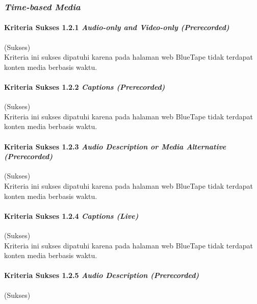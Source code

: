 \subsubsection{\textit{Time-based Media}}
\label{subsubsec:kepatuhan_bluetape_time_based_media}

\paragraph{Kriteria Sukses 1.2.1 \textit{Audio-only and Video-only (Prerecorded)}}
\label{par:kepatuhan_bluetape_kriteria_sukses_1.2.1}
(Sukses)\\

Kriteria ini sukses dipatuhi karena pada halaman web BlueTape tidak terdapat konten media berbasis waktu.

\paragraph{Kriteria Sukses 1.2.2 \textit{Captions (Prerecorded)}}
\label{par:kepatuhan_bluetape_kriteria_sukses_1.2.2}
(Sukses)\\

Kriteria ini sukses dipatuhi karena pada halaman web BlueTape tidak terdapat konten media berbasis waktu.

\paragraph{Kriteria Sukses 1.2.3 \textit{Audio Description or Media Alternative (Prerecorded)}}
\label{par:kepatuhan_bluetape_kriteria_sukses_1.2.3}
(Sukses)\\

Kriteria ini sukses dipatuhi karena pada halaman web BlueTape tidak terdapat konten media berbasis waktu.

\paragraph{Kriteria Sukses 1.2.4 \textit{Captions (Live)}}
\label{par:kepatuhan_bluetape_kriteria_sukses_1.2.4}
(Sukses)\\

Kriteria ini sukses dipatuhi karena pada halaman web BlueTape tidak terdapat konten media berbasis waktu.

\paragraph{Kriteria Sukses 1.2.5 \textit{Audio Description (Prerecorded)}}
\label{par:kepatuhan_bluetape_kriteria_sukses_1.2.5}
(Sukses)\\

